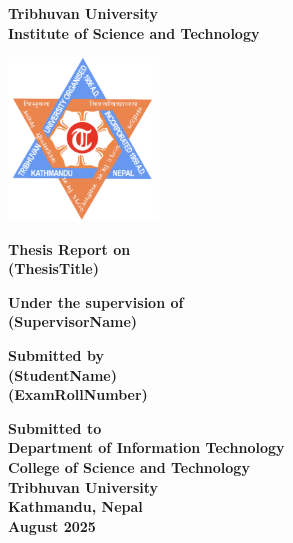\documentclass[a4paper,12pt]{report}
\begin{document}
\begin{titlepage}
    \begin{center}

        \textbf{\Huge Tribhuvan University}\\
        \textbf{\Large Institute of Science and Technology}\\
        
        \vspace{1in}
        
        \includegraphics[width=0.3\textwidth]{Pictures/TU Logo.png}
        
        \vspace{1in}
        
        \textbf{\Huge Thesis Report on}\\
        \textbf{\Large (ThesisTitle)}\\
        
        \vspace{1in}
        
        \textbf{\Large Under the supervision of}\\
        \textbf{\Large (SupervisorName)}\\
        
        \vfill
        
        \textbf{\Large Submitted by}\\
        \textbf{\Large (StudentName)}\\
        \textbf{\Large (ExamRollNumber)}\\
        
        \vfill
        
        \textbf{\Large Submitted to}\\
        \textbf{\Large Department of Information Technology}\\
        \textbf{\Large College of Science and Technology}\\
        \textbf{\Large Tribhuvan University}\\
        \textbf{\Large Kathmandu, Nepal}\\
        \textbf{\large August 2025}\\
    \end{center}
    
\end{titlepage}
\end{document}
